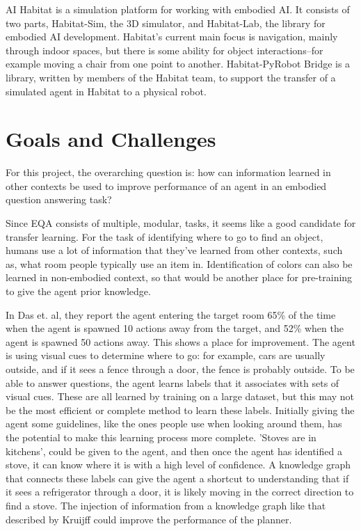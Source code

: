 \documentclass{article}
\begin{document}
AI Habitat is a simulation platform for working with embodied AI\cite{habitat19iccv}. It consists of two parts, Habitat-Sim, the 3D simulator, and Habitat-Lab, the library for embodied AI development. Habitat's current main focus is navigation, mainly through indoor spaces, but there is some ability for object interactions--for example moving a chair from one point to another. Habitat-PyRobot Bridge is a library, written by members of the Habitat team, to support the transfer of a simulated agent in Habitat to a physical robot\cite{Kadian_2020}. 


\section{Goals and Challenges}

For this project, the overarching question is: how can information learned in other contexts be used to improve performance of an agent in an embodied question answering task? %

Since EQA consists of multiple, modular, tasks, it seems like a good candidate for transfer learning. For the task of identifying where to go to find an object, humans use a lot of information that they've learned from other contexts, such as, what room people typically use an item in. Identification of colors can also be learned in non-embodied context, so that would be another place for pre-training to give the agent prior knowledge. 

In Das et. al, they report the agent entering the target room 65\% of the time when the agent is spawned 10 actions away from the target, and 52\% when the agent is spawned 50 actions away\cite{embodiedqa}. This shows a place for improvement. The agent is using visual cues to determine where to go: for example, cars are usually outside, and if it sees a fence through a door, the fence is probably outside. To be able to answer questions, the agent learns labels that it associates with sets of visual cues. These are all learned by training on a large dataset, but this may not be the most efficient or complete method to learn these labels. Initially giving the agent some guidelines, like the ones people use when looking around them, has the potential to make this learning process more complete. 'Stoves are in kitchens', could be given to the agent, and then once the agent has identified a stove, it can know where it is with a high level of confidence. A knowledge graph that connects these labels can give the agent a shortcut to understanding that if it sees a refrigerator through a door, it is likely moving in the correct direction to find a stove. The injection of information from a knowledge graph like that described by Kruijff could improve the performance of the planner\cite{Kruijff:2007}. 
\end{document}

